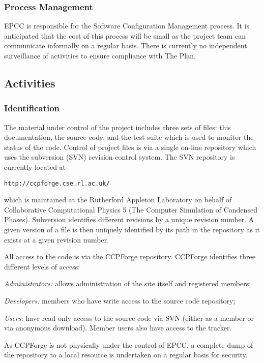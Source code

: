 \documentclass[11pt,twoside]{article}
\begin{document}
\subsubsection{Process Management}

EPCC is responsible for the Software Configuration Management process.
It is anticipated that the cost of this process will be small as the
project team can communicate informally on a regular basis. There is
currently no independent
surveillance of activities to ensure compliance with The Plan.

\subsection{Activities}

\subsubsection{Identification}

The material under control of the project includes three sets of files:
this documentation, the source code, and the test suite which is used
to monitor the status of the code.
Control of project files is via a single on-line repository which
uses the subversion (SVN) revision control system. The SVN repository
is currently located at

\texttt{http://ccpforge.cse.rl.ac.uk/}

which is maintained at the Rutherford Appleton Laboratory on behalf
of Collaborative Computational Physics 5 (The Computer Simulation of
Condensed Phases). Subversion identifies different revisions by a
unique revision number. A given version of a file is then uniquely
identified by its path in the repository as it exists at a given
revision number.


All access to the code is via the CCPForge repository. CCPForge identifies
three different levels of access:

\textit{Administrators:} allows administration of the site itself and
registered members;

\textit{Developers:} members who have write access to the source code repository;

\textit{Users:} have read only access to the source code via SVN (either
as a member or via anonymous download). Member users also have access to
the tracker.

As CCPForge is not physically under the control of EPCC, a
complete dump of the repository to a local resource is undertaken on a
regular basis for security.
\end{document}
